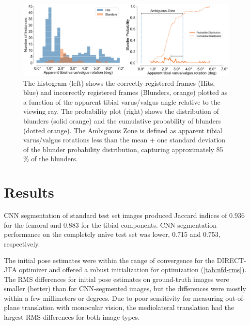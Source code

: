 {\begin{figure}[hb]
	\centering
	\includegraphics[width = \linewidth]{figs/jtml-paper/fig5-histo.png}
	\caption[The histogram (left) shows the correctly registered frames (Hits, blue) and incorrectly registered frames  (Blunders, orange) plotted as a function of the apparent tibial varus/valgus angle relative to the viewing ray]{The histogram (left) shows the correctly registered frames (Hits, blue) and incorrectly registered frames  (Blunders, orange) plotted as a function of the apparent tibial varus/valgus angle relative to the viewing ray. The probability plot (right) shows the distribution of blunders (solid orange) and the cumulative probability of blunders (dotted orange). The Ambiguous Zone is defined as apparent tibial varus/valgus rotations less than the mean + one standard deviation of the blunder probability distribution, capturing approximately 85 \% of the blunders.}
	\label{fig:histo-pdf}
\end{figure}


\section{Results}
\label{sec:jtml-results}
CNN segmentation of standard test set images produced Jaccard indices of 0.936 for the femoral and 0.883 for the tibial components. CNN segmentation performance on the completely naïve test set was lower, 0.715 and 0.753, respectively.

The initial pose estimates were within the range of convergence for the DIRECT-JTA optimizer and offered a robust initialization for optimization (\cref{tab:nfd-rms}).
The RMS differences for initial pose estimates on ground-truth images were smaller (better) than for CNN-segmented images, but the differences were mostly within a few millimeters or degrees.
Due to poor sensitivity for measuring out-of-plane translation with monocular vision, the mediolateral translation had the largest RMS differences for both image types.


}
